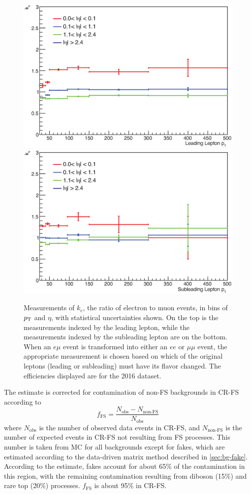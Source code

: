 \begin{centering}
\begin{figure}[!hbt]
\myfloatalign
\includegraphics[width=.85\linewidth]{figures/fs/data_efficiencies_2j_Z_lep0.eps}
\includegraphics[width=.85\linewidth]{figures/fs/data_efficiencies_2j_Z_lep1.eps}
\caption{Measurements of $k_e$, the ratio of electron to muon events, in bins of $p_{\text{T}}$ and $\eta$, with statistical uncertainties shown. On the top is the measurements indexed by the leading lepton, while the measurements indexed by the subleading lepton are on the bottom. When an $e\mu$ event is transformed into either an $ee$ or $\mu\mu$ event, the appropriate measurement is chosen based on which of the original leptons (leading or subleading) must have its flavor changed. The efficiencies displayed are for the 2016 dataset.}
\label{fig:fs_k}
\end{figure}
\end{centering}

The estimate is corrected for contamination of non-\ac{FS} backgrounds in CR-FS according to
%
\begin{equation}
f_{\mathrm{FS}} = \frac{N_\text{obs} - N_\text{non-FS}}{N_\text{obs}}
\end{equation}
%
where $N_\text{obs}$ is the number of observed data events in CR-FS, and $N_\text{non-FS}$ is the number of expected events in CR-FS not resulting from \ac{FS} processes. This number is taken from \ac{MC} for all backgrounds except for fakes, which are estimated according to the data-driven matrix method described in \autoref{sec:bg-fake}. According to the estimate, fakes account for about 65\% of the contamination in this region, with the remaining contamination resulting from diboson (15\%) and rare top (20\%) processes. $f_{\mathrm{FS}}$ is about 95\% in CR-FS. 


